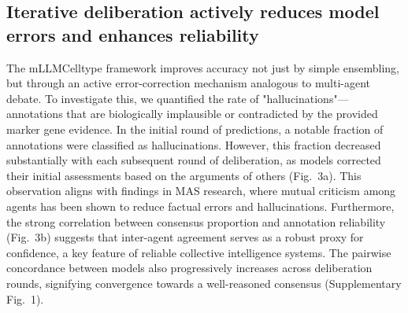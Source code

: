 \documentclass[pdflatex,sn-nature]{sn-jnl}%
\theoremstyle{thmstyleone}%
\theoremstyle{thmstyletwo}%
\theoremstyle{thmstylethree}%
\begin{document}
\subsection{Iterative deliberation actively reduces model errors and enhances reliability}
The mLLMCelltype framework improves accuracy not just by simple ensembling, but through an active error-correction mechanism analogous to multi-agent debate\cite{duImprovingFactualityReasoning2023}. To investigate this, we quantified the rate of "hallucinations"—annotations that are biologically implausible or contradicted by the provided marker gene evidence. In the initial round of predictions, a notable fraction of annotations were classified as hallucinations. However, this fraction decreased substantially with each subsequent round of deliberation, as models corrected their initial assessments based on the arguments of others (Fig.~3a). This observation aligns with findings in MAS research, where mutual criticism among agents has been shown to reduce factual errors and hallucinations\cite{duImprovingFactualityReasoning2023}. Furthermore, the strong correlation between consensus proportion and annotation reliability (Fig.~3b) suggests that inter-agent agreement serves as a robust proxy for confidence, a key feature of reliable collective intelligence systems. The pairwise concordance between models also progressively increases across deliberation rounds, signifying convergence towards a well-reasoned consensus (Supplementary Fig.~1).
\end{document}
